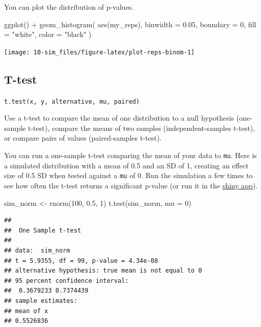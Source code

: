 \documentclass[
  oneside]{book}
\newenvironment{Shaded}{\begin{snugshade}}{\end{snugshade}}
\newcommand{\AttributeTok}[1]{\textcolor[rgb]{0.77,0.63,0.00}{#1}}
\newcommand{\DecValTok}[1]{\textcolor[rgb]{0.00,0.00,0.81}{#1}}
\newcommand{\FloatTok}[1]{\textcolor[rgb]{0.00,0.00,0.81}{#1}}
\newcommand{\FunctionTok}[1]{\textcolor[rgb]{0.00,0.00,0.00}{#1}}
\newcommand{\NormalTok}[1]{#1}
\newcommand{\OtherTok}[1]{\textcolor[rgb]{0.56,0.35,0.01}{#1}}
\newcommand{\SpecialCharTok}[1]{\textcolor[rgb]{0.00,0.00,0.00}{#1}}
\newcommand{\StringTok}[1]{\textcolor[rgb]{0.31,0.60,0.02}{#1}}
\begin{document}
You can plot the distribution of p-values.

\begin{Shaded}
\begin{Highlighting}[]
\FunctionTok{ggplot}\NormalTok{() }\SpecialCharTok{+} 
  \FunctionTok{geom\_histogram}\NormalTok{(}
    \FunctionTok{aes}\NormalTok{(my\_reps), }
    \AttributeTok{binwidth =} \FloatTok{0.05}\NormalTok{, }
    \AttributeTok{boundary =} \DecValTok{0}\NormalTok{,}
    \AttributeTok{fill =} \StringTok{"white"}\NormalTok{, }
    \AttributeTok{color =} \StringTok{"black"}
\NormalTok{  )}
\end{Highlighting}
\end{Shaded}

\begin{center}\texttt{[image: 10-sim\_files/figure-latex/plot-reps-binom-1]} \end{center}

\hypertarget{t-test}{%
\subsection{T-test}\label{t-test}}

\texttt{t.test(x,\ y,\ alternative,\ mu,\ paired)}

Use a t-test to compare the mean of one distribution to a null hypothesis (one-sample t-test), compare the means of two samples (independent-samples t-test), or compare pairs of values (paired-samples t-test).

You can run a one-sample t-test comparing the mean of your data to \texttt{mu}. Here is a simulated distribution with a mean of 0.5 and an SD of 1, creating an effect size of 0.5 SD when tested against a \texttt{mu} of 0. Run the simulation a few times to see how often the t-test returns a significant p-value (or run it in the \href{http://shiny.psy.gla.ac.uk/debruine/normsim/}{shiny app}).

\begin{Shaded}
\begin{Highlighting}[]
\NormalTok{sim\_norm }\OtherTok{\textless{}{-}} \FunctionTok{rnorm}\NormalTok{(}\DecValTok{100}\NormalTok{, }\FloatTok{0.5}\NormalTok{, }\DecValTok{1}\NormalTok{)}
\FunctionTok{t.test}\NormalTok{(sim\_norm, }\AttributeTok{mu =} \DecValTok{0}\NormalTok{)}
\end{Highlighting}
\end{Shaded}

\begin{verbatim}
## 
##  One Sample t-test
## 
## data:  sim_norm
## t = 5.9355, df = 99, p-value = 4.34e-08
## alternative hypothesis: true mean is not equal to 0
## 95 percent confidence interval:
##  0.3679233 0.7374439
## sample estimates:
## mean of x 
## 0.5526836
\end{verbatim}
\end{document}

